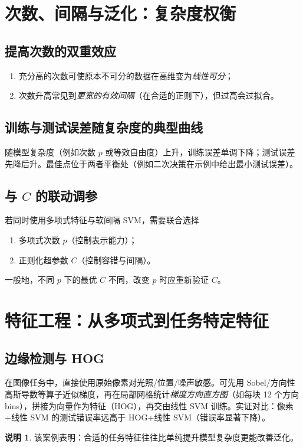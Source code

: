 \documentclass[10.5pt,hyperref,a4paper,UTF8]{ctexart}
\theoremstyle{definition}
\newtheorem{remark}{说明}
\begin{document}
\section{次数、间隔与泛化：复杂度权衡}
\subsection{提高次数的双重效应}
\begin{enumerate}
  \item 充分高的次数可使原本不可分的数据在高维变为\emph{线性可分}；
  \item 次数升高常见到\emph{更宽的有效间隔}（在合适的正则下），但过高会过拟合。
\end{enumerate}

\subsection{训练与测试误差随复杂度的典型曲线}
随模型复杂度（例如次数 $p$ 或等效自由度）上升，训练误差单调下降；测试误差先降后升。最佳点位于两者平衡处（例如二次决策在示例中给出最小测试误差）。

\subsection{与 \(C\) 的联动调参}
若同时使用多项式特征与软间隔 SVM，需要联合选择
\begin{enumerate}
  \item 多项式次数 $p$（控制表示能力）；
  \item 正则化超参数 $C$（控制容错与间隔）。
\end{enumerate}
一般地，不同 $p$ 下的最优 $C$ 不同，改变 $p$ 时应重新验证 $C$。

\section{特征工程：从多项式到任务特定特征}
\subsection{边缘检测与 HOG}
在图像任务中，直接使用原始像素对光照/位置/噪声敏感。可先用 Sobel/方向性高斯导数等算子近似梯度，再在局部网格统计\emph{梯度方向直方图}（如每块 12 个方向 bins），拼接为向量作为特征（HOG），再交由线性 SVM 训练。实证对比：像素+线性 SVM 的测试错误率远高于 HOG+线性 SVM（错误率显著下降）。
\begin{remark}
该案例表明：合适的任务特征往往比单纯提升模型复杂度更能改善泛化。
\end{remark}
\end{document}

